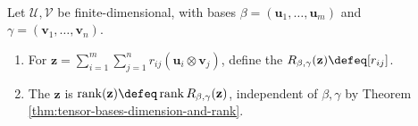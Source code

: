 \begin{definition} \label{def:tensor-coordinate-matrix-and-rank} \\
Let $\mathcal{U},\mathcal{V}$ be finite-dimensional, with bases $\beta=(\mathbf{u}_1,\ldots,\mathbf{u}_m)$ and $\gamma=(\mathbf{v}_1,\ldots,\mathbf{v}_n)$.
\begin{enumerate}[label=(\roman*)]
\setlength{\itemsep}{0pt}
\item For $\mathbf{z}=\sum\limits_{i=1}^{m}\sum\limits_{j=1}^{n} r_{ij}(\mathbf{u}_i\otimes\mathbf{v}_j)$, define the  $R_{\beta,\gamma}(\mathbf{z})\defeq[r_{ij}]$.
\item The  $\mathbf{z}$ is $\operatorname{rank}(\mathbf{z})\defeq\operatorname{rank}R_{\beta,\gamma}(\mathbf{z})$, independent of $\beta,\gamma$ by Theorem \ref{thm:tensor-bases-dimension-and-rank}.
\end{enumerate}
\end{definition}

